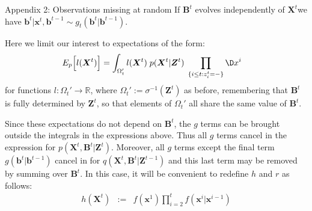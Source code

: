 \documentclass[9pt, xcolor={dvipsnames,svgnames,table}]{beamer}
\newcommand{\Real}{\mathbb R}
\begin{document}
\begin{frame}{Appendix 2: Observations missing at random}
    If $\bm{B}^t$ evolves independently of $\bm{X}^t$we have $\bm{b}^t | \bm{x}^t, \bm{b}^{t-1} \sim g_t(\bm{b}^t | \bm{b}^{t-1})$.
    
    Here we limit our interest to expectations of the form:
    \begin{align*}
        E_{p} \Big[l(\bm{X}^{t}) \Big] &=  \int_{\Omega_t'} l(\bm{X}^{t})\; p(\bm{X}^{t} | \bm{Z}^{t})\; \prod_{ \{ i \leq t  : z^t_{i} = - \} } \D x^i
    \end{align*}
    for functions $l: \Omega_t'  \rightarrow \Real$, where $\Omega_t' := \sigma^{-1}(\bm{Z}^{t})$ as before, remembering that $\bm{B}^{t}$ is fully determined by $\bm{Z}^{t}$, so that elements of $\Omega_t'$ all share the same value of $\bm{B}^{t}$. 

    Since these expectations do not depend on $\bm{B}^t$, the $g$ terms can be brought outside the integrals in the expressions above. Thus all $g$ terms cancel in the expression for $p(\bm{X}^t, \bm{B}^t | \bm{Z}^t)$. Moreover, all $g$ terms except the final term $g(\bm{b}^t | \bm{b}^{t-1})$ cancel in for $q(\bm{X}^t, \bm{B}^t | \bm{Z}^{t-1})$ and this last term may be removed by summing over $\bm{B}^t$. In this case, it will be convenient to redefine $h$ and $r$ as follows:
    \begin{eqnarray*}
        h(\bm{X}^t) & := & f(\bm{x}^1)\prod_{i=2}^{t} f(\bm{x}^i | \bm{x}^{i-1})
    \end{eqnarray*}
    \end{frame}
    
    
    
\end{document}
